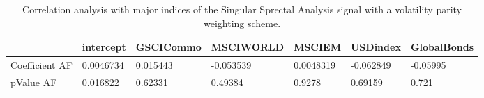 \begin{table}[H]
\centering
\begin{tabular}{lllllll}
& intercept & GSCICommo & MSCIWORLD & MSCIEM & USDindex & GlobalBonds \\ 
\hline 
Coefficient AF & 0.0046734 & 0.015443 & -0.053539 & 0.0048319 & -0.062849 & -0.05995 \\ 
pValue AF & 0.016822 & 0.62331 & 0.49384 & 0.9278 & 0.69159 & 0.721 \\ 
\hline
\end{tabular}
\caption{Correlation analysis with major indices of the Singular Sprectal Analysis signal with a volatility parity weighting scheme.}
\label{SSA_AFACTOR}
\end{table}